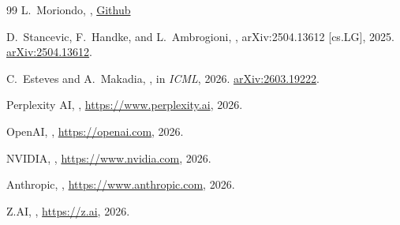 \documentclass[11pt]{article}
\begin{document}
\begin{thebibliography}{99}
    L.~Moriondo,
    ,
    \newblock \href{https://github.com/tuned-org-uk/arrowspace-latent-diffusion}{Github}

    D.~Stancevic, F.~Handke, and L.~Ambrogioni,
    ,
    \newblock arXiv:2504.13612 [cs.LG], 2025.
    \newblock \href{https://arxiv.org/abs/2504.13612}{arXiv:2504.13612}.

    C.~Esteves and A.~Makadia,
    ,
    \newblock in {\em ICML}, 2026.
    \newblock \href{https://arxiv.org/abs/2603.19222}{arXiv:2603.19222}.

    Perplexity AI,
    ,
    \newblock \href{https://www.perplexity.ai}{https://www.perplexity.ai}, 2026.

    OpenAI,
    ,
    \newblock \href{https://openai.com}{https://openai.com}, 2026.

    NVIDIA,
    ,
    \newblock \href{https://www.nvidia.com}{https://www.nvidia.com}, 2026.

    Anthropic,
    ,
    \newblock \href{https://www.anthropic.com}{https://www.anthropic.com}, 2026.

    Z.AI,
    ,
    \newblock \href{https://z.ai}{https://z.ai}, 2026.

    \end{thebibliography}


    
\end{document}
